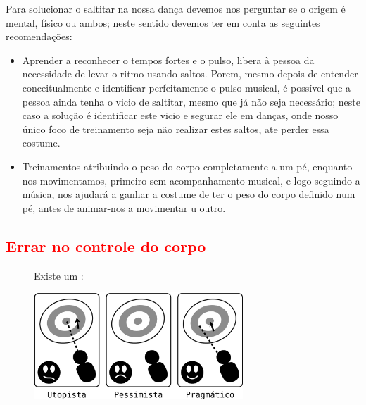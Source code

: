 \begin{SolutionT}
Para solucionar o saltitar na nossa dança devemos nos perguntar se o origem é mental, físico ou ambos;
neste sentido devemos ter em conta as seguintes recomendações:
\begin{itemize}
\item  Aprender a reconhecer o tempos fortes e o pulso, 
libera à pessoa da necessidade de levar o ritmo usando saltos.
Porem, mesmo depois de entender conceitualmente e identificar perfeitamente o pulso musical,
é possível que a pessoa ainda tenha o vicio de saltitar, mesmo que já não seja necessário;
neste caso a solução é identificar este vicio e segurar ele em danças, 
onde nosso único foco de treinamento seja não realizar estes saltos, ate perder essa costume.
\item  Treinamentos atribuindo o peso do corpo completamente a um pé, 
enquanto nos movimentamos, primeiro sem acompanhamento musical,
e logo seguindo a música, 
nos ajudará a ganhar a costume de ter o peso do corpo definido num pé,
antes de animar-nos a movimentar u outro. 
\end{itemize}
\end{SolutionT}




\subsection{\textcolor{red}{Errar no controle do corpo}}

\begin{figure}[!ht]
\begin{elaboracion}[title=O utopista\, o pessimista e o pragmático, width= 1.00\linewidth]
Existe um :

\begin{center}
    \includegraphics[width=0.7\textwidth]{chapters/cap-body-control/problema-generico-completo.eps}
\end{center}
\end{elaboracion}
\end{figure}

